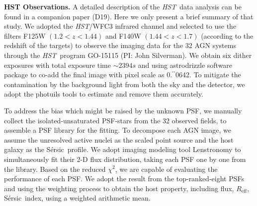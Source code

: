 \documentclass{natureprintstyle}
\newcommand{\hst}{{\it HST}}
\newcommand{\mbh}{$\mathcal M_{\rm BH}$}
\newcommand{\halpha}{${\it H}\alpha$}
\newcommand{\hbeta}{${\it H}\beta$}
\newcommand{\sersic}{S\'ersic}
\newcommand{\lenstronomy}{{\sc Lenstronomy}}
\newcommand{\reff}{{$R_{\mathrm{eff}}$}}
\newcommand{\Mgii}{Mg$_{\rm II}$}
\newcommand{\Civ}{C$_{\rm IV}$}
\newcommand{\farcs}{\mbox{\ensuremath{.\!\!^{\prime\prime}}}}%
\begin{document}

\textbf{HST Observations.} 
A detailed description of the \hst\ data analysis can be found in a companion paper (D19). Here we only present a brief summary of that study. We adopted the \hst/WFC3 infrared channel and selected to use the filters F125W $(1.2<z<1.44)$ and F140W $(1.44<z<1.7)$ (according to the redshift of the targets) to observe the imaging data for the 32 AGN systems through the \hst\ program GO-15115 (PI: John Silverman). We obtain six dither exposures with total exposure time $\sim2394s$ and using  {\sc astrodrizzle} software package to co-add the final image with pixel scale as 0\farcs0642. To mitigate the contamination by the background light from both the sky and the detector, we adopt the {\sc photuils} tools to estimate and remove them accurately.

To address the bias which might be raised by the unknown PSF, we manually collect the isolated-unsaturated PSF-stars from the 32 observed fields, to assemble a PSF library for the fitting. To decompose each AGN image, we assume the unresolved active nuclei as the scaled point source and the host galaxy as the \sersic\ profile. We adopt imaging modeling tool \lenstronomy\cite{lenstronomy} to simultaneously fit their 2-D flux distribution, taking each PSF one by one from the library. Based on the reduced $\chi^2$, we are capable of evaluating the performance of each PSF. We adopt the result from the top-ranked-eight PSFs and using the weighting process to obtain the host property, including flux, \reff, \sersic\ index, using a weighted arithmetic mean.
\end{document}
